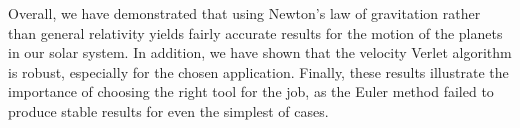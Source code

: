 \documentclass[prc,amsmath,twocolumn,superscriptaddress]{revtex4}
\begin{document}
Overall, we have demonstrated that using Newton's law of gravitation rather than general relativity yields fairly accurate results for the motion of the planets in our solar system. In addition, we have shown that the velocity Verlet algorithm is robust, especially for the chosen application. Finally, these results illustrate the importance of choosing the right tool for the job, as the Euler method failed to produce stable results for even the simplest of cases.




\end{document}
